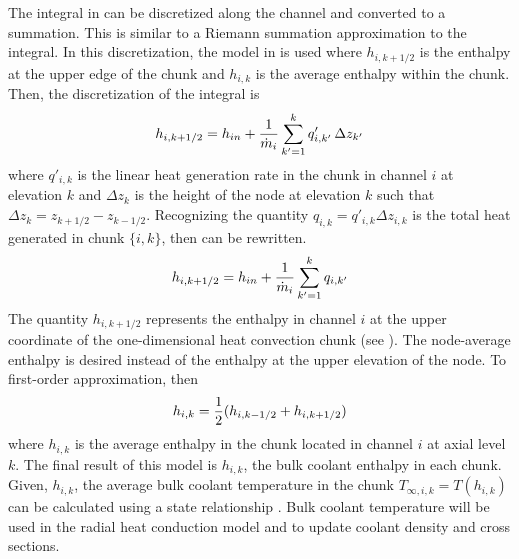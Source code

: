     The integral in  can be discretized along
    the channel and converted to a summation. This is similar to a Riemann
    summation approximation to the integral. In this discretization, the model
    in  is used where $h_{i,k+1/2}$ is the enthalpy at the
    upper edge of the chunk and $h_{i,k}$ is the average enthalpy within the
    chunk. Then, the discretization of the integral
     is 
    \begin{equation}
      \label{eq:heat_balance}
      h_{i,k+1/2} = 
        h_{in} + \frac{1}{\dot{m}_i} \sum_{k'=1}^{k} q'_{i,k'} \, \Delta z_{k'}
    \end{equation}
    where $q'_{i,k}$ is the linear heat generation rate in the chunk in channel
    $i$ at elevation $k$ and $\Delta z_k$ is the height of the node at elevation
    $k$ such that ${\Delta z_{k} = z_{k+1/2} - z_{k-1/2}}$. 
    Recognizing the quantity $q_{i,k} = q'_{i,k} \Delta z_{i,k}$ is the total
    heat generated in chunk $\{i,k\}$, then  can be
    rewritten.
    \begin{equation}
      h_{i,k+1/2} = h_{in} + \frac{1}{\dot{m}_i} \sum_{k'=1}^{k} q_{i,k'}
    \end{equation}
    The quantity $h_{i,k+1/2}$ represents the enthalpy in channel $i$ at the 
    upper coordinate of the one-dimensional heat convection chunk (see
    ). The node-average enthalpy is desired instead of the
    enthalpy at the upper elevation of the node. To first-order approximation, 
    then
    \begin{equation}
      h_{i,k} = \frac{1}{2} (h_{i,k-1/2}+h_{i,k+1/2})
    \end{equation}
    where $h_{i,k}$ is the average enthalpy in the chunk located in channel $i$
    at axial level $k$. The final result of this model is $h_{i,k}$, the bulk 
    coolant enthalpy in each chunk. Given, $h_{i,k}$, the average bulk coolant 
    temperature in the chunk $T_{\infty,i,k} = T(h_{i,k})$ can be calculated 
    using a state relationship \cite{sodiumProp}. Bulk coolant temperature 
    will be used in the radial heat conduction model and to update coolant
    density and cross sections.
  
